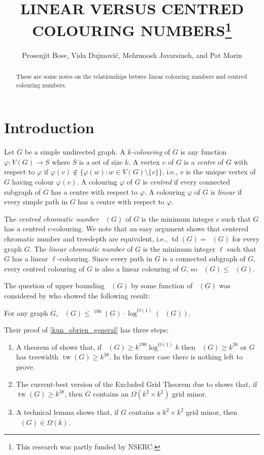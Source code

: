 \documentclass{patmorin}
\title{\MakeUppercase{Linear versus centred Colouring Numbers}\thanks{This research was partly funded by NSERC.}}
\author{Prosenjit Bose, Vida Dujmović, Mehrnoosh Javarsineh, and Pat Morin}
\date{}
\DeclareMathOperator{\tw}{tw}
\DeclareMathOperator{\td}{td}
\DeclareMathOperator{\chicen}{\chi_{\mathrm{cen}}}
\DeclareMathOperator{\chilin}{\chi_{\mathrm{lin}}}
\begin{document}
\maketitle

\begin{abstract}
    These are some notes on the relationships betwee linear colouring numbers and centred colouring numbers.
\end{abstract}

\section{Introduction}

Let $G$ be a simple undirected graph.  A \emph{$k$-colouring} of $G$ is any function $\varphi:V(G)\to S$ where $S$ is a set of size $k$.  A vertex $v$ of $G$ is a \emph{centre} of $G$ with respect to $\varphi$ if $\varphi(v)\not\in\{\varphi(w):w\in V(G)\setminus\{v\}\}$, i.e., $v$ is the unique vertex of $G$ having colour $\varphi(v)$.  A colouring $\varphi$ of $G$ is \emph{centred} if every connected subgraph of $G$ has a centre with respect to $\varphi$. A colouring $\varphi$ of $G$ is \emph{linear} if every simple path in $G$ has a centre with respect to $\varphi$.

The \emph{centred chromatic number} $\chicen(G)$ of $G$ is the minimum integer $c$ such that $G$ has a centred $c$-colouring.  We note that an easy argument shows that centered chromatic number and treedepth are equivalent, i.e., $\td(G)=\chicen(G)$ for every graph $G$. The \emph{linear chromatic number} of $G$ is the minimum integer $\ell$ such that $G$ has a linear $\ell$-colouring.  Since every path in $G$ is a connected subgraph of $G$, every centred colouring of $G$ is also a linear colouring of $G$, so $\chilin(G)\le\chicen(G)$.

The question of upper bounding $\chicen(G)$ by some function of $\chilin(G)$ was considered by \citet[Theorem~1]{kun.obrien.ea:polynomial} who showed the following result:

\begin{thm}\label{kun_obrien_general}
  For any graph $G$, $\chicen(G)\le \chilin^{190}(G)\cdot\log^{O(1)}(\chilin(G))$.
\end{thm}


Their proof of \cref{kun_obrien_general} has three steps:
\begin{enumerate}
  \item A theorem of \citet{kawarabayashi.rossman:polynomial} shows that, if $\chicen(G)\ge k^{190}\log^{O(1)} k$ then $\chilin(G)\ge k^{38}$ or $G$ has treewidth $\tw(G)\ge k^{38}$.  In the former case there is nothing left to prove.
  \item The current-best version of the Excluded Grid Theorem due to \citet{chuzhoy:improved} shows that, if $\tw(G)\ge k^{38}$, then $G$ contains an $\Omega(k^2\times k^2)$ grid minor.
  \item A technical lemma \cite[Lemma~5]{kun.obrien.ea:polynomial} shows that, if $G$ contains a $k^2\times k^2$ grid minor, then $\chilin(G)\in\Omega(k)$.
\end{enumerate}
\end{document}
